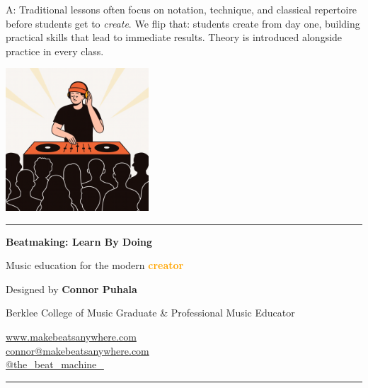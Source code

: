 \documentclass[11pt,letterpaper]{article}
\newcommand{\orangetext}[1]{\textcolor{orange}{\textbf{#1}}}
\begin{document}
A: Traditional lessons often focus on notation, technique, and classical repertoire before students get to \textit{create}. We flip that: students create from day one, building practical skills that lead to immediate results. Theory is introduced alongside practice in every class.

\vspace{1cm}

\begin{center}
\includegraphics[width=0.4\textwidth]{../../assets/images/illustrations/DJShow.png}
\end{center}

\vspace{0.5cm}

\begin{center}
\rule{0.8\textwidth}{0.5pt}

\vspace{0.5cm}

\Large\textbf{Beatmaking: Learn By Doing}

\vspace{0.3cm}

\normalsize Music education for the modern \orangetext{creator}

\vspace{0.5cm}

\small Designed by \textbf{Connor Puhala}

\small Berklee College of Music Graduate \& Professional Music Educator

\vspace{0.8cm}

\normalsize
\href{https://www.makebeatsanywhere.com/}{www.makebeatsanywhere.com} \\[0.2cm]
\href{mailto:connor@makebeatsanywhere.com}{connor@makebeatsanywhere.com} \\[0.2cm]
\href{https://www.instagram.com/the_beat_machine_}{@the\_beat\_machine\_}

\vspace{0.5cm}

\rule{0.8\textwidth}{0.5pt}
\end{center}
\end{document}

